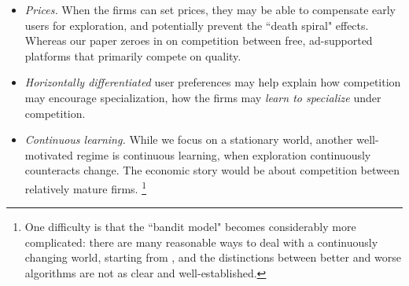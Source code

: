 \documentclass[../competing_bandits.tex]{subfiles}
\begin{document}
\begin{itemize}

\item \emph{Prices.}
When the firms can set prices, they may be able to compensate early users for exploration, and potentially prevent the ``death spiral" effects. Whereas our paper zeroes in on competition between free, ad-supported platforms that primarily compete on quality.

\item
\emph{Horizontally differentiated} user preferences may help explain how competition may encourage specialization, \ie how the firms may \emph{learn to specialize} under competition.


\item \emph{Continuous learning.}
While we focus on a stationary world, another well-motivated regime is continuous learning, when exploration continuously counteracts change. The economic story would be about competition between relatively mature firms.%
\footnote{One difficulty is that the ``bandit model" becomes considerably more complicated: there are many reasonable ways to deal with a continuously changing world, starting from \citet{DynamicMAB-colt08}, and the distinctions between better and worse algorithms are not as clear and well-established.}


\end{itemize}

\end{document}

